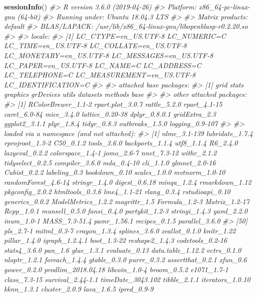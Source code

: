 \documentclass[]{book}
\newenvironment{Shaded}{\begin{snugshade}}{\end{snugshade}}
\newcommand{\CommentTok}[1]{\textcolor[rgb]{0.56,0.35,0.01}{\textit{#1}}}
\newcommand{\KeywordTok}[1]{\textcolor[rgb]{0.13,0.29,0.53}{\textbf{#1}}}
\newcommand{\NormalTok}[1]{#1}
\begin{document}
\begin{Shaded}
\begin{Highlighting}[]
\KeywordTok{sessionInfo}\NormalTok{()}
\CommentTok{#> R version 3.6.0 (2019-04-26)}
\CommentTok{#> Platform: x86_64-pc-linux-gnu (64-bit)}
\CommentTok{#> Running under: Ubuntu 18.04.3 LTS}
\CommentTok{#> }
\CommentTok{#> Matrix products: default}
\CommentTok{#> BLAS/LAPACK: /usr/lib/x86_64-linux-gnu/libopenblasp-r0.2.20.so}
\CommentTok{#> }
\CommentTok{#> locale:}
\CommentTok{#>  [1] LC_CTYPE=en_US.UTF-8       LC_NUMERIC=C               LC_TIME=en_US.UTF-8        LC_COLLATE=en_US.UTF-8     LC_MONETARY=en_US.UTF-8    LC_MESSAGES=en_US.UTF-8    LC_PAPER=en_US.UTF-8       LC_NAME=C                  LC_ADDRESS=C               LC_TELEPHONE=C             LC_MEASUREMENT=en_US.UTF-8 LC_IDENTIFICATION=C       }
\CommentTok{#> }
\CommentTok{#> attached base packages:}
\CommentTok{#> [1] grid      stats     graphics  grDevices utils     datasets  methods   base     }
\CommentTok{#> }
\CommentTok{#> other attached packages:}
\CommentTok{#>  [1] RColorBrewer_1.1-2 rpart.plot_3.0.7   rattle_5.2.0       rpart_4.1-15       caret_6.0-84       mice_3.4.0         lattice_0.20-38    dplyr_0.8.0.1      gridExtra_2.3      ggplot2_3.1.1      plyr_1.8.4         tidyr_0.8.3        outbreaks_1.5.0    logging_0.9-107   }
\CommentTok{#> }
\CommentTok{#> loaded via a namespace (and not attached):}
\CommentTok{#>  [1] nlme_3.1-139        lubridate_1.7.4     rprojroot_1.3-2     C50_0.1.2           tools_3.6.0         backports_1.1.4     utf8_1.1.4          R6_2.4.0            lazyeval_0.2.2      colorspace_1.4-1    jomo_2.6-7          nnet_7.3-12         withr_2.1.2         tidyselect_0.2.5    compiler_3.6.0      mda_0.4-10          cli_1.1.0           glmnet_2.0-16       Cubist_0.2.2        labeling_0.3        bookdown_0.10       scales_1.0.0        mvtnorm_1.0-10      randomForest_4.6-14 stringr_1.4.0       digest_0.6.18       minqa_1.2.4         rmarkdown_1.12      pkgconfig_2.0.2     htmltools_0.3.6     lme4_1.1-21         rlang_0.3.4         rstudioapi_0.10     generics_0.0.2      ModelMetrics_1.2.2  magrittr_1.5        Formula_1.2-3       Matrix_1.2-17       Rcpp_1.0.1          munsell_0.5.0       fansi_0.4.0         partykit_1.2-3      stringi_1.4.3       yaml_2.2.0          inum_1.0-1          MASS_7.3-51.4       pamr_1.56.1         recipes_0.1.5       parallel_3.6.0     }
\CommentTok{#> [50] pls_2.7-1           mitml_0.3-7         crayon_1.3.4        splines_3.6.0       zeallot_0.1.0       knitr_1.22          pillar_1.4.0        igraph_1.2.4.1      boot_1.3-22         reshape2_1.4.3      codetools_0.2-16    stats4_3.6.0        pan_1.6             glue_1.3.1          evaluate_0.13       data.table_1.12.2   vctrs_0.1.0         nloptr_1.2.1        foreach_1.4.4       gtable_0.3.0        purrr_0.3.2         assertthat_0.2.1    xfun_0.6            gower_0.2.0         prodlim_2018.04.18  libcoin_1.0-4       broom_0.5.2         e1071_1.7-1         class_7.3-15        survival_2.44-1.1   timeDate_3043.102   tibble_2.1.1        iterators_1.0.10    kknn_1.3.1          cluster_2.0.9       lava_1.6.5          ipred_0.9-9}
\end{Highlighting}
\end{Shaded}


\end{document}
